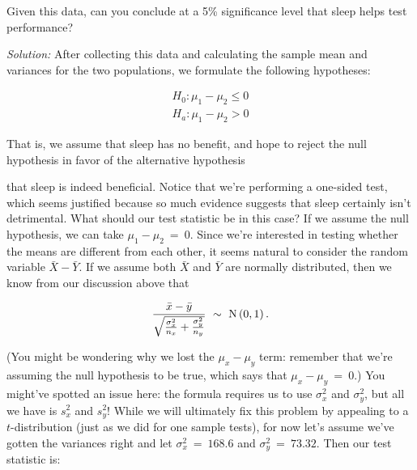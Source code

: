 Given this data, can you conclude at a 5\% significance level that sleep helps test performance?



\emph{Solution:}  After collecting this data and calculating the sample mean and variances for the two populations, we formulate the following hypotheses:



\begin{eqnarray}

H_0:\mu_{1}-\mu_{2}\leq 0 \nonumber\\

H_a:\mu_{1}-\mu_{2}>0

\end{eqnarray}

That is, we assume that sleep has no benefit, and hope to reject the null hypothesis in favor of the alternative hypothesis

that sleep is indeed beneficial. Notice that we're performing a one-sided test, which seems justified because so much evidence suggests that sleep certainly isn't detrimental.  What should our test statistic be in this case?  If we assume the null hypothesis, we can take $\mu_1 - \mu_2\ = \ 0$.  Since we're interested in testing whether the means are different from each other, it seems natural to consider the random variable $\bar{X} - \bar{Y}$.  If we assume both $\bar{X}$ and $\bar{Y}$ are normally distributed, then we know from our discussion above that



\begin{equation*}

\frac{\bar{x} - \bar{y}}{\sqrt{\frac{\sigma^2_x}{n_x}+\frac{\sigma^2_y}{n_y}}} \ \sim \  {\rm N}\left(0,1\right).

\end{equation*}

(You might be wondering why we lost the $\mu_x - \mu_y$ term: remember that we're assuming the null hypothesis to be true, which says that $\mu_x - \mu_y \ = \ 0$.)  You might've spotted an issue here: the formula requires us to use $\sigma^2_x$ and $\sigma^2_y$, but all we have is $s^2_x$ and $s^2_y$!  While we will ultimately fix this problem by appealing to a $t$-distribution (just as we did for one sample tests), for now let's assume we've gotten the variances right and let $\sigma^2_x\ = \ 168.6$ and $\sigma^2_y\ = \ 73.32$.  Then our test statistic is:



